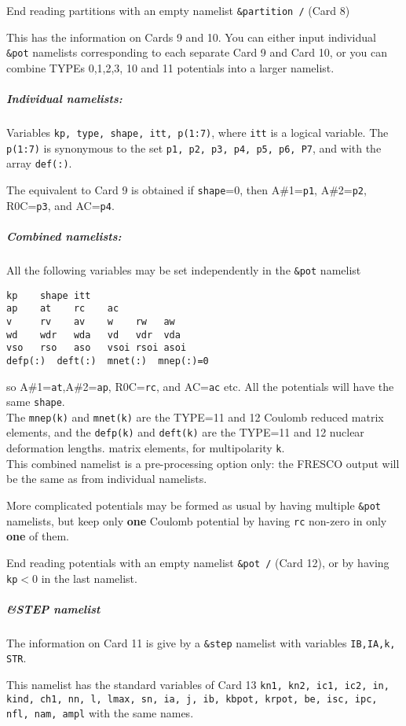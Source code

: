 \documentclass[11pt]{article}
\begin{document}
\bigskip
End reading partitions with an empty namelist {\tt \&partition /} (Card 8)


This has the information on Cards 9 and 10.
You can either input individual {\tt \&pot} namelists corresponding to each
separate Card 9 and Card 10, or you can combine TYPEs 0,1,2,3, 10 and 11 potentials
into a larger namelist.

\subparagraph*{Individual namelists:}

Variables {\tt kp, type, shape, itt, p(1:7)}, where {\tt itt} is a logical variable.
The {\tt p(1:7)} is synonymous to the set {\tt p1, p2, p3, p4, p5, p6, P7},
and with the array {\tt def(:)}.

The equivalent to Card 9 is obtained if {\tt shape}=0,
then  A\#1={\tt p1}, A\#2={\tt p2},  R0C={\tt p3}, and AC={\tt p4}.


\subparagraph*{Combined namelists:}
All the following variables may be set independently in the {\tt \&pot} namelist
\begin{verbatim}
kp    shape itt
ap    at    rc    ac
v     rv    av    w    rw   aw
wd    wdr   wda   vd   vdr  vda
vso   rso   aso   vsoi rsoi asoi
defp(:)  deft(:)  mnet(:)  mnep(:)=0
\end{verbatim}
so  A\#1={\tt at},A\#2={\tt ap},  R0C={\tt rc}, and AC={\tt ac} etc.
All the potentials will have the same {\tt shape}.\\
The {\tt mnep(k)} and {\tt mnet(k)} are the TYPE=11 and 12 Coulomb reduced matrix elements,
and
the {\tt defp(k)} and {\tt deft(k)} are the TYPE=11 and 12 nuclear deformation lengths.
matrix elements, for multipolarity {\tt k}.\\
This combined namelist is a pre-processing option only: the FRESCO output
will be the same as from individual namelists.

\bigskip
More complicated potentials  may be formed as usual by having multiple
{\tt \&pot} namelists, but keep only {\bf one} Coulomb potential by having
{\tt rc} non-zero in only {\bf one} of them.

\bigskip
End reading potentials with an empty namelist {\tt \&pot /} (Card 12),
or by having {\tt kp}$<$0 in the last namelist.

\subparagraph*{\&STEP namelist}

The information on Card 11 is give by a {\tt \&step} namelist with variables
{\tt IB,IA,k, STR}.

This namelist has the standard variables of Card 13
{\tt    kn1, kn2, ic1, ic2, in, kind, ch1, nn, l, lmax, sn,
        ia, j, ib, kbpot, krpot, be, isc, ipc, nfl, nam, ampl}
with the same names.\\
\end{document}
